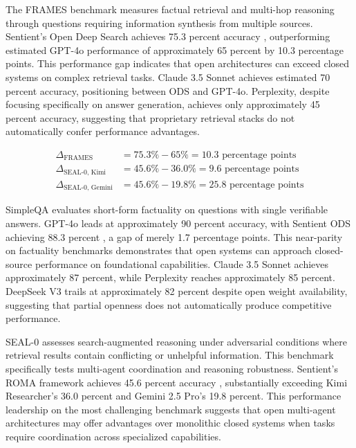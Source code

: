 The FRAMES benchmark measures factual retrieval and multi-hop reasoning through questions requiring information synthesis from multiple sources. Sentient's Open Deep Search achieves 75.3 percent accuracy \cite{ods_github2025}, outperforming estimated GPT-4o performance of approximately 65 percent by 10.3 percentage points. This performance gap indicates that open architectures can exceed closed systems on complex retrieval tasks. Claude 3.5 Sonnet achieves estimated 70 percent accuracy, positioning between ODS and GPT-4o. Perplexity, despite focusing specifically on answer generation, achieves only approximately 45 percent accuracy, suggesting that proprietary retrieval stacks do not automatically confer performance advantages.

\begin{align}
\Delta_{\text{FRAMES}} &= 75.3\% - 65\% = 10.3\text{ percentage points} \label{eq:frames_gap}\\
\Delta_{\text{SEAL-0, Kimi}} &= 45.6\% - 36.0\% = 9.6\text{ percentage points} \label{eq:seal_kimi}\\
\Delta_{\text{SEAL-0, Gemini}} &= 45.6\% - 19.8\% = 25.8\text{ percentage points} \label{eq:seal_gemini}
\end{align}

SimpleQA evaluates short-form factuality on questions with single verifiable answers. GPT-4o leads at approximately 90 percent accuracy, with Sentient ODS achieving 88.3 percent \cite{ods_github2025}, a gap of merely 1.7 percentage points. This near-parity on factuality benchmarks demonstrates that open systems can approach closed-source performance on foundational capabilities. Claude 3.5 Sonnet achieves approximately 87 percent, while Perplexity reaches approximately 85 percent. DeepSeek V3 trails at approximately 82 percent despite open weight availability, suggesting that partial openness does not automatically produce competitive performance.

SEAL-0 assesses search-augmented reasoning under adversarial conditions where retrieval results contain conflicting or unhelpful information. This benchmark specifically tests multi-agent coordination and reasoning robustness. Sentient's ROMA framework achieves 45.6 percent accuracy \cite{roma_twitter2025}, substantially exceeding Kimi Researcher's 36.0 percent and Gemini 2.5 Pro's 19.8 percent. This performance leadership on the most challenging benchmark suggests that open multi-agent architectures may offer advantages over monolithic closed systems when tasks require coordination across specialized capabilities.

